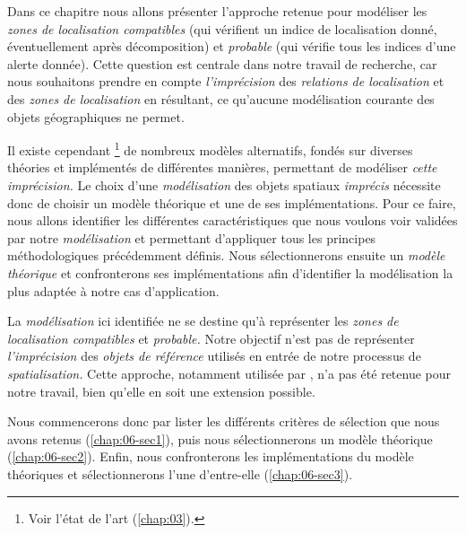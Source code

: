 Dans ce chapitre nous allons présenter l'approche retenue pour
modéliser les \emph{zones de localisation compatibles} (\ie qui
vérifient un indice de localisation donné, éventuellement après
décomposition) et \emph{probable} (qui vérifie tous les indices d'une
alerte donnée). Cette question est centrale dans notre travail de
recherche, car nous souhaitons prendre en compte \emph{l'imprécision}
des \emph{relations de localisation} et des \emph{zones de
  localisation} en résultant, ce qu'aucune modélisation courante des
objets géographiques ne permet.

Il existe cependant \footnote{Voir l'état de l'art
  (\autoref{chap:03}).} de nombreux modèles alternatifs, fondés sur
diverses théories et implémentés de différentes manières, permettant
de modéliser \emph{cette imprécision.} Le choix d'une
\emph{modélisation} des objets spatiaux \emph{imprécis} nécessite donc
de choisir un modèle théorique et une de ses implémentations. Pour ce
faire, nous allons identifier les différentes caractéristiques que
nous voulons voir validées par notre \emph{modélisation} et permettant
d'appliquer tous les principes méthodologiques précédemment
définis. Nous sélectionnerons ensuite un \emph{modèle théorique} et
confronterons ses implémentations afin d'identifier la modélisation la
plus adaptée à notre cas d’application.

La \emph{modélisation} ici identifiée ne se destine qu'à représenter
les \emph{zones de localisation compatibles} et \emph{probable.}
Notre objectif n'est pas de représenter \emph{l'imprécision} des
\emph{objets de référence} utilisés en entrée de notre processus de
\emph{spatialisation.} Cette approche, notamment utilisée par
\textcite{Bloch1996}, n'a pas été retenue pour notre travail, bien
qu'elle en soit une extension possible.

Nous commencerons donc par lister les différents critères de sélection
que nous avons retenus (\ref{chap:06-sec1}), puis nous sélectionnerons
un modèle théorique (\ref{chap:06-sec2}). Enfin, nous confronterons
les implémentations du modèle théoriques et sélectionnerons l'une
d'entre-elle (\ref{chap:06-sec3}).

